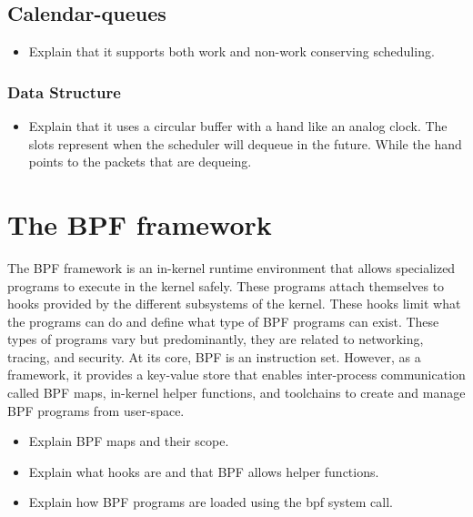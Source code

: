 \documentclass[sigconf, nonacm]{acmart}
\begin{document}
\subsection{Calendar-queues}

\begin{itemize}
  \item Explain that it supports both work and non-work conserving scheduling.
\end{itemize}


\subsubsection{Data Structure}

\begin{itemize}
  \item Explain that it uses a circular buffer with a hand like an analog clock. The slots represent when the scheduler will dequeue in the future. While the hand points to the packets that are dequeing.
\end{itemize}


\section{The BPF framework}

The BPF framework is an in-kernel runtime environment that allows specialized programs to execute in the kernel safely. These programs attach themselves to hooks provided by the different subsystems of the kernel. These hooks limit what the programs can do and define what type of BPF programs can exist. These types of programs vary but predominantly, they are related to networking, tracing, and security. At its core, BPF is an instruction set. However, as a framework, it provides a key-value store that enables inter-process communication called BPF maps, in-kernel helper functions, and toolchains to create and manage BPF programs from user-space.


\begin{itemize}
  \item Explain BPF maps and their scope.
  \item Explain what hooks are and that BPF allows helper functions.
  \item Explain how BPF programs are loaded using the bpf system call.
\end{itemize}
\end{document}
